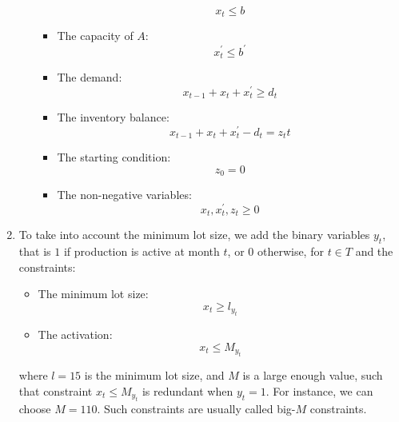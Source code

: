 \documentclass[12pt, a4paper]{report}
\newtheorem[style=M,bodystyle=\normalfont]{theorem}{Theorem}
\newtheorem[style=M,bodystyle=\normalfont]{corollary}{Corollary}
\newtheorem[style=M,bodystyle=\normalfont]{lemma}{Lemma}
\newtheorem[style=M,bodystyle=\normalfont]{definition}{Definition}
\begin{document}
\begin{Answer}[ref=4]
\begin{enumerate}
\begin{itemize}
\begin{itemize}
                                \[x_t \leq b\]
                            \item The capacity of $A$: 
                                \[x_t^{'} \leq b^{'}\]
                            \item The demand: 
                                \[x_{t-1}+x_t+x_t^{'} \geq d_t\]
                            \item The inventory balance: 
                                \[x_{t-1}+x_t+x_t^{'}-d_t = z_tt\]
                            \item The starting condition: 
                                \[z_0=0\]
                            \item The non-negative variables: 
                                \[x_t,x_t^{'},z_t \geq 0\]
                            \end{itemize}
                \end{itemize}
            \item To take into account the minimum lot size, we add the binary variables $y_t$, that is $1$ if production is active at month $t$, or $0$ otherwise, for 
                $t \in T$ and the constraints: 
                \begin{itemize}
                    \item The minimum lot size: 
                        \[x_t \geq l_{y_t}\]
                    \item The activation: 
                        \[x_t \leq M_{y_t}\]
                \end{itemize}
                where $l = 15$ is the minimum lot size, and $M$ is a large enough value, such that constraint $x_t \leq M_{y_t}$ is redundant when $y_t=1$. For instance, 
                we can choose $M = 110$. Such constraints are usually called big-$M$ constraints. 
        \end{enumerate}
        
    \end{Answer}









\newpage
\end{document}
